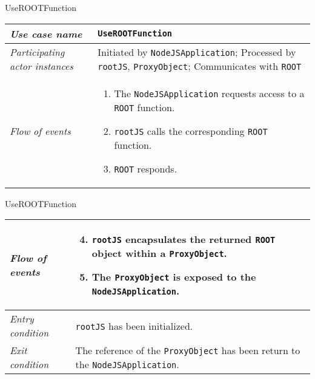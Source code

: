 \begin{frame}{UseROOTFunction}
        \begin{longtable}{p{3cm} @{\hskip 1cm} p{7cm}}
                \hline

                \textit{Use case name} & \texttt{UseROOTFunction}\\
                \hline

                \textit{Participating actor instances} & Initiated by \texttt{NodeJSApplication}; Processed by \texttt{rootJS}, \texttt{ProxyObject}; Communicates with \texttt{ROOT}\\
                \hline

                \textit{Flow of events} &
                        \begin{enumerate}
                                \item The \texttt{NodeJSApplication} requests access to a \texttt{ROOT} function.
                                \item \texttt{rootJS} calls the corresponding \texttt{ROOT} function.
                                \item \texttt{ROOT} responds.
                        \end{enumerate}
                        \\
        \end{longtable}
\end{frame}
\begin{frame}[t]{UseROOTFunction}
        \begin{longtable}{p{3cm} @{\hskip 1cm} p{7cm}}
                \textit{Flow of events} &
                        \begin{enumerate}
                                \setcounter{enumi}{3}
                                \item \texttt{rootJS} encapsulates the returned \texttt{ROOT} object within a \texttt{ProxyObject}.
                                \item The \texttt{ProxyObject} is exposed to the \texttt{NodeJSApplication}.
                        \end{enumerate}
                       \\
                \hline

                \textit{Entry condition} & \texttt{rootJS} has been initialized.\\
                \hline

                \textit{Exit condition} & The reference of the \texttt{ProxyObject} has been return to the \texttt{NodeJSApplication}.\\
                \hline
        \end{longtable}
\end{frame}

